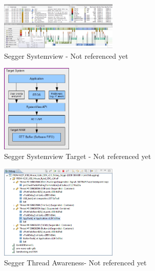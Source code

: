 \begin{figure}[ht!]
	\centering
		\includegraphics[width=0.5\textwidth]{Pictures/Segger/systemview.png}
	\caption{Segger Systemview - Not referenced yet}
	\label{fig:Systemview}
\end{figure}
\begin{figure}[ht!]
	\centering
		\includegraphics[width=0.3\textwidth]{Pictures/Segger/SystemViewTarget.png}
	\caption{Segger Systemview Target - Not referenced yet}
	\label{fig:SystemviewTarget}
\end{figure}
\begin{figure}[ht!]
	\centering
		\includegraphics[width=0.5\textwidth]{Pictures/Segger/freertosThreadAwareness}
	\caption{Segger Thread Awareness- Not referenced yet}
	\label{fig:ThreadAware}
\end{figure}